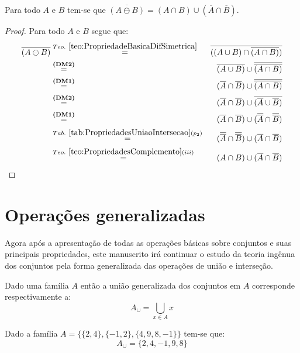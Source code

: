 \begin{theorem}
	Para todo $A$ e $B$ tem-se que $\overline{(A \ominus B)} = (A \cap B) \cup (\overline{A} \cap \overline{B})$.
\end{theorem}

\begin{proof}
	Para todo $A$ e $B$ segue que:
	\begin{eqnarray*}
		\overline{(A \ominus B)} & \stackrel{Teo. \ \ref{teo:PropriedadeBasicaDifSimetrica}}{=} & \overline{((A \cup B) \cap \overline{(A \cap B)})}\\
		& \stackrel{\textbf{(DM2)}}{=}& \overline{(A \cup B)} \cup \overline{\overline{(A \cap B)}}\\
		& \stackrel{\textbf{(DM1)}}{=}& (\overline{A} \cap \overline{B}) \cup \overline{\overline{(A \cap B)}}\\
		& \stackrel{\textbf{(DM2)}}{=}& (\overline{A} \cap \overline{B}) \cup \overline{(\overline{A} \cup \overline{B})}\\
		& \stackrel{\textbf{(DM1)}}{=}& (\overline{A} \cap \overline{B}) \cup (\overline{\overline{A}} \cap \overline{\overline{B}})\\
		& \stackrel{Tab. \ \ref{tab:PropriedadesUniaoIntersecao}(p_2)}{=}& (\overline{\overline{A}} \cap \overline{\overline{B}}) \cup (\overline{A} \cap \overline{B})\\
		& \stackrel{Teo. \ \ref{teo:PropriedadesComplemento}(iii)}{=}& (A \cap B) \cup (\overline{A} \cap \overline{B})
	\end{eqnarray*}
\end{proof}

\section{Operações generalizadas}\label{sec:OperacaoGeneralizada}

Agora após a apresentação de todas as operações básicas sobre conjuntos e suas principais propriedades, este manuscrito irá continuar o estudo da teoria ingênua dos conjuntos pela forma generalizada das operações de união e interseção. 

\begin{definition}\label{def:UniaoGeneralizadas}
	Dado uma família $A$ então a união generalizada dos conjuntos em $A$ corresponde respectivamente a:
	$$A_\cup = \bigcup_{x \in A} x$$
\end{definition}

\begin{example}
	Dado a família $A = \{\{2, 4\}, \{-1, 2\}, \{4, 9, 8, -1\}\}$ tem-se que:
	$$A_\cup = \{2, 4, -1, 9, 8\}$$
\end{example}

